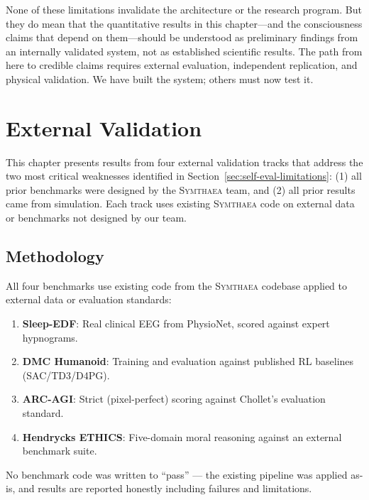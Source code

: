 \documentclass[12pt]{book}
\newcommand{\symthaea}{\textsc{Symthaea}}
\begin{document}
None of these limitations invalidate the architecture or the research program. But they do mean that the quantitative results in this chapter---and the consciousness claims that depend on them---should be understood as preliminary findings from an internally validated system, not as established scientific results. The path from here to credible claims requires external evaluation, independent replication, and physical validation. We have built the system; others must now test it.


\chapter{External Validation}
\label{ch:external-validation}

This chapter presents results from four external validation tracks that address the two most critical weaknesses identified in Section~\ref{sec:self-eval-limitations}: (1) all prior benchmarks were designed by the \symthaea{} team, and (2) all prior results came from simulation. Each track uses existing \symthaea{} code on external data or benchmarks not designed by our team.

\section{Methodology}

All four benchmarks use existing code from the \symthaea{} codebase applied to external data or evaluation standards:

\begin{enumerate}
  \item \textbf{Sleep-EDF}: Real clinical EEG from PhysioNet, scored against expert hypnograms.
  \item \textbf{DMC Humanoid}: Training and evaluation against published RL baselines (SAC/TD3/D4PG).
  \item \textbf{ARC-AGI}: Strict (pixel-perfect) scoring against Chollet's evaluation standard.
  \item \textbf{Hendrycks ETHICS}: Five-domain moral reasoning against an external benchmark suite.
\end{enumerate}

No benchmark code was written to ``pass'' --- the existing pipeline was applied as-is, and results are reported honestly including failures and limitations.
\end{document}

